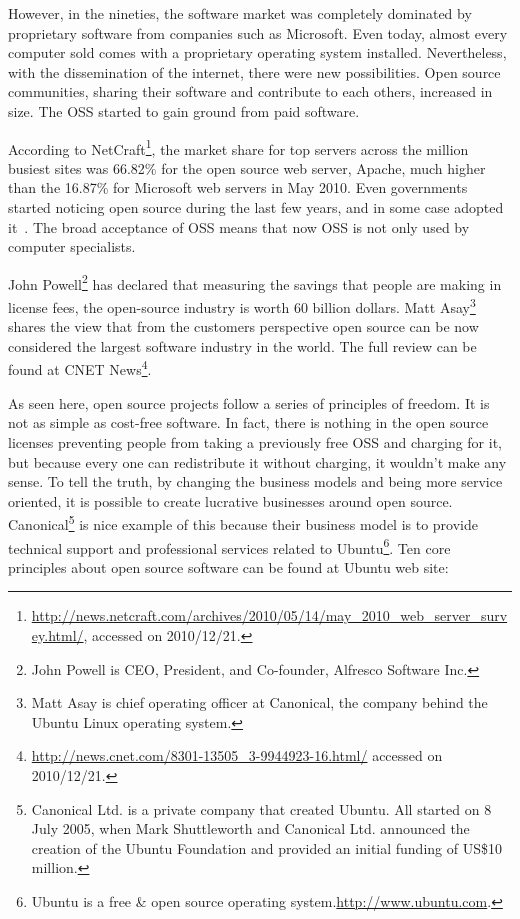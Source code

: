 However, in the nineties, the software market was completely dominated 
by proprietary software from companies such as Microsoft.
Even today, almost every computer sold
comes with a proprietary operating system installed.
Nevertheless, with the dissemination of the internet, there were new possibilities. 
Open source communities, sharing their software and contribute to each others, increased in size.
The OSS started to gain ground from paid software.

According to \textsf{NetCraft}\footnote{\url{http://news.netcraft.com/archives/2010/05/14/may\_2010\_web\_server\_survey.html/}, accessed on 2010/12/21.},
the market share for top servers across the million busiest sites was 66.82\% for the open source web server, Apache,
much higher than the 16.87\% for Microsoft web servers in May 2010.
Even governments started noticing open source during the last few years, and in some case adopted it~\cite{hahn2002government}.
The broad acceptance of OSS means that now OSS is not only used by computer specialists.

\textsf{John Powell}\footnote{John Powell is CEO, President, and Co-founder, Alfresco Software Inc.}
has declared that measuring the savings that people are making in license fees, the open-source industry is worth 60 billion dollars.
\textsf{Matt Asay}\footnote{Matt Asay is chief operating officer at Canonical, the company behind the Ubuntu Linux operating system.}
shares the view that from the customers perspective open source can be now considered the largest software industry in the world.
The full review can be found at \textsf{CNET News}\footnote{\url{http://news.cnet.com/8301-13505\_3-9944923-16.html/} accessed on 2010/12/21.}. 

As seen here, open source projects follow a series of principles of freedom. 
It is not as simple as cost-free software. 
In fact, there is nothing in the open source licenses preventing people from taking a previously free OSS and charging for it,
but because every one can redistribute it without charging, it wouldn't make any sense.
To tell the truth, by changing the business models and being more service oriented,
it is possible to create lucrative businesses around open source.
\textsf{Canonical}\footnote{
  Canonical Ltd. is a private company that created Ubuntu. 
  All started on 8 July 2005, when Mark Shuttleworth and Canonical Ltd. 
  announced the creation of the Ubuntu Foundation and provided an initial funding of US\$10 million.
}
is nice example of this because their business model is to provide technical support and professional services related to 
\textsf{Ubuntu}\footnote{
  Ubuntu is a free \& open source operating system.\url{http://www.ubuntu.com}.
}.
Ten core principles about open source software can be found at Ubuntu web site:

